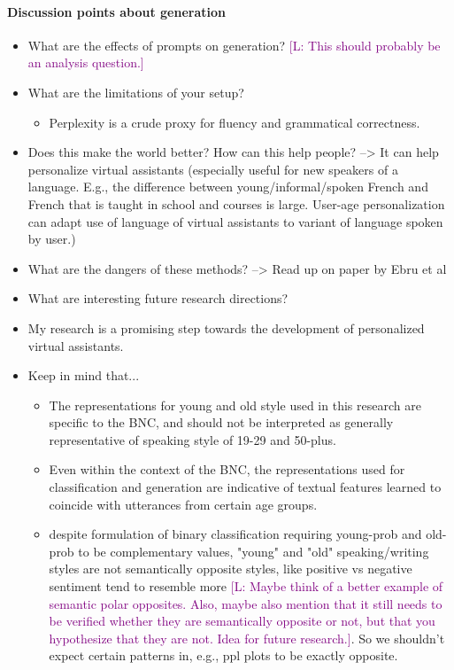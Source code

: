 \documentclass{report}
\newcommand{\len}[1]{\textcolor{purple}{[L: #1]}} %
\begin{document}
\paragraph{Discussion points about generation}
\begin{itemize}
    \item What are the effects of prompts on generation? \len{This should probably be an analysis question.}
    \item What are the limitations of your setup?
        \begin{itemize}
            \item Perplexity is a crude proxy for fluency and grammatical correctness.
        \end{itemize}
    \item Does this make the world better? How can this help people? --> It can help personalize virtual assistants (especially useful for new speakers of a language. E.g., the difference between young/informal/spoken French and French that is taught in school and courses is large. User-age personalization can adapt use of language of virtual assistants to variant of language spoken by user.)
    \item What are the dangers of these methods? --> Read up on paper by Ebru et al
    \item What are interesting future research directions?
    \item My research is a promising step towards the development of personalized virtual assistants.
    \item Keep in mind that...
        \begin{itemize}
            \item  The representations for young and old style used in this research are specific to the BNC, and should not be interpreted as generally representative of speaking style of 19-29 and 50-plus.
            \item Even within the context of the BNC, the representations used for classification and generation are indicative of textual features learned to coincide with utterances from certain age groups.
            \item despite formulation of binary classification requiring young-prob and old-prob to be complementary values, "young" and "old" speaking/writing styles are not semantically opposite styles, like positive vs negative sentiment tend to resemble more \len{Maybe think of a better example of semantic polar opposites. Also, maybe also mention that it still needs to be verified whether they are semantically opposite or not, but that you hypothesize that they are not. Idea for future research.}. So we shouldn't expect certain patterns in, e.g., ppl plots to be exactly opposite.

\end{itemize}
\end{itemize}
\end{document}
